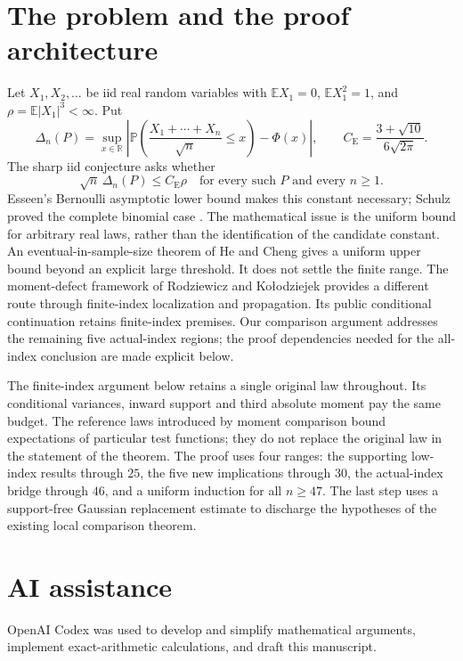 \documentclass[aop,preprint]{imsart}
\theoremstyle{definition}
\newcommand{\CE}{C_{\mathrm E}}
\newcommand{\E}{\mathbb E}
\newcommand{\PP}{\mathbb P}
\numberwithin{equation}{section}
\begin{document}
\section{The problem and the proof architecture}
Let \(X_1,X_2,\ldots\) be iid real random variables with
\(\E X_1=0\), \(\E X_1^2=1\), and \(\rho=\E|X_1|^3<\infty\). Put
\[
 \Delta_n(P)=\sup_{x\in\mathbb R}
 \left|\PP\!\left(\frac{X_1+\cdots+X_n}{\sqrt n}\le x\right)-\Phi(x)\right|,
 \qquad
 \CE=\frac{3+\sqrt{10}}{6\sqrt{2\pi}}.
\]
The sharp iid conjecture asks whether
\[
 \sqrt n\,\Delta_n(P)\le\CE\rho
 \quad\text{for every such }P\text{ and every }n\ge1.
\]
Esseen's Bernoulli asymptotic lower bound makes this constant necessary;
Schulz proved the complete binomial case \cite{Schulz2016}.
The mathematical issue is the uniform bound for arbitrary real laws,
rather than the identification of the candidate constant.
An eventual-in-sample-size theorem of He and Cheng
\cite{HeCheng2026} gives a uniform upper bound beyond an explicit
large threshold. It does not settle the finite range.
The moment-defect framework of Rodziewicz and Ko\l{}odziejek
\cite{RK2026} provides a different route through finite-index
localization and propagation. Its public conditional continuation
retains finite-index premises. Our comparison argument addresses
the remaining five actual-index regions; the proof dependencies
needed for the all-index conclusion are made explicit below.

The finite-index argument below retains a single original law throughout.
Its conditional variances, inward support and third absolute moment pay
the same budget. The reference laws introduced by moment comparison
bound expectations of particular test functions; they do not replace
the original law in the statement of the theorem.
The proof uses four ranges: the supporting low-index results through
$25$, the five new implications through $30$, the actual-index bridge
through $46$, and a uniform induction for all $n\ge47$.
The last step uses a support-free Gaussian replacement estimate to
discharge the hypotheses of the existing local comparison theorem.








\section*{AI assistance}
OpenAI Codex was used to develop and simplify mathematical arguments,
implement exact-arithmetic calculations, and draft this manuscript.
\end{document}
